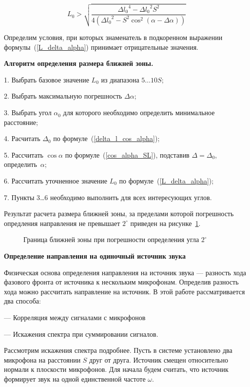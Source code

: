 \documentclass[fleqn,10pt,a4paper]{article}
\begin{document}
\begin{equation}
	\boxed {
		L_0 >
		\sqrt{\frac{{\Delta{}l_0}^4 - {\Delta{}l_0}^2S^2}{4\left({\Delta{}l_0}^2-
		S^2\cos^2\left(\alpha - \Delta\alpha\right)\right)}}
	}\label{L_delta_alpha}
\end{equation}

Определим условия, при которых знаменатель в подкоренном выражении
формулы~(\ref{L_delta_alpha}) принимает отрицательные значения.

\bigskip

\textbf{Алгоритм определения размера ближней зоны.}

1. Выбрать базовое значение $L_0$ из диапазона $5\ldots10 S$;

2. Выбрать максимальную погрешность $\Delta\alpha$;

3. Выбрать угол $\alpha_0$ для которого необходимо определить минимальное
расстояние;

4. Расчитать $\Delta_0$ по формуле~(\ref{delta_l_cos_alpha});

5. Рассчитать $\cos\alpha$ по формуле~(\ref{cos_alpha_SL}), подставив
$\Delta=\Delta_0$, определить~$\alpha$;

6. Рассчитать уточненное значение $L_0$ по формуле~(\ref{L_delta_alpha});

7. Пункты 3\ldots6 необходимо выполнить для всех интересующих углов.

\bigskip
Результат расчета размера ближней зоны, за пределами которой погрешность
опредления направления не превышает $2^\circ$ приведен на рисунке~\ref{nz_plot}.

\begin {figure}
	\begin{center}
		
	\end{center}\label{nz_plot}
	\caption{Граница ближней зоны при погрешности определения угла $2^\circ$}
\end {figure}

\bigskip
\textbf{Определение направления на одиночный источник звука}

Физическая основа определения направления на источник звука --- разность хода
фазового фронта от источника к нескольким микрофонам. Определив разность хода
можно рассчитать направление на источник. В этой работе рассматривается два
способа:

--- Корреляция между сигналами с микрофонов

--- Искажения спектра при суммировании сигналов.

Рассмотрим искажения спектра подробнее. Пусть в системе установлено два
микрофона на расстоянии $S$ друг от друга. Источник смещен относительно нормали
к плоскости микрофонов. Для начала будем считать, что источник формирует звук на
одной единственной частоте $\omega$.
\end{document}
